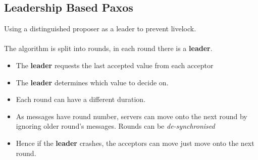 
\subsection{Leadership Based Paxos}
Using a distinguished proposer as a leader to prevent livelock.
\\
\\ The algorithm is split into rounds, in each round there is a \textbf{leader}.
\begin{itemize}
    \item The \textbf{leader} requests the last accepted value from each acceptor
    \item The \textbf{leader} determines which value to decide on.
    \item Each round can have a different duration.
    \item As messages have round number, servers can move onto the next round by ignoring older round's messages. Rounds can be \textit{de-synchronised} 
    \item Hence if the \textbf{leader} crashes, the acceptors can move just move onto the next round.
\end{itemize}
\unfinished





